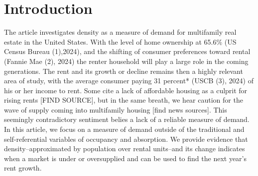 \documentclass[sn-mathphys-num]{sn-jnl}%
\theoremstyle{thmstyleone}%
\theoremstyle{thmstyletwo}%
\theoremstyle{thmstylethree}%
\begin{document}
\section{Introduction}\label{sec1}

   

The article investigates density as a measure of demand for multifamily real estate in the United States. With the level of home ownership at 65.6\% (US Census Bureau (1),2024), and the shifting of consumer preferences toward rental (Fannie Mae (2), 2024) the renter household will play a large role in the coming generations. The rent and its growth or decline remains then a highly relevant area of study, with the average consumer paying 31 percent* (USCB (3), 2024) of his or her income to rent. Some cite a lack of affordable housing as a culprit for rising rents [FIND SOURCE], but in the same breath, we hear caution for the wave of supply coming into multifamily housing [find news sources]. This seemingly contradictory sentiment belies a lack of a reliable measure of demand. In this article, we focus on a measure of demand outside of the traditional and self-referential variables of occupancy and absorption. We provide evidence that density--approximated by population over rental units--and its change indicates when a market is under or oversupplied and can be used to find the next year's rent growth.  

   
\end{document}
